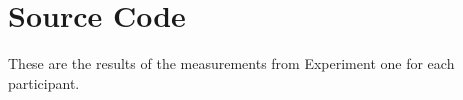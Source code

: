 \chapter{Source Code}

These are the results of the measurements from Experiment one for each participant. 

\newpage

\newpage

\newpage

\newpage
